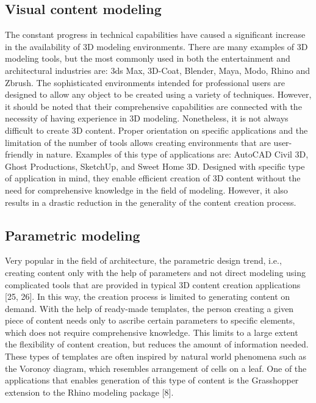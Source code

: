 \documentclass[runningheads]{llncs}
\begin{document}
\subsection{Visual content modeling}
The constant progress in technical capabilities have caused a significant increase in the availability of 3D modeling environments. There are many examples of 3D modeling tools, but the most commonly used in both the entertainment and architectural industries are: 3ds Max, 3D-Coat, Blender, Maya, Modo, Rhino and Zbrush. The sophisticated environments intended for professional users are designed to allow any object to be created using a variety of techniques. However, it should be noted that their comprehensive capabilities are connected with the necessity of having experience in 3D modeling. Nonetheless, it is not always difficult to create 3D content. Proper orientation on specific applications and the limitation of the number of tools allows creating environments that are user-friendly in nature. Examples of this type of applications are: AutoCAD Civil 3D, Ghost Productions, SketchUp, and Sweet Home 3D. Designed with specific type of application in mind, they enable efficient creation of 3D content without the need for comprehensive knowledge in the field of modeling. However, it also results in a drastic reduction in the generality of the content creation process.

\subsection{Parametric modeling}
Very popular in the field of architecture, the parametric design trend, i.e., creating content only with the help of parameters and not direct modeling using complicated tools that are provided in typical 3D content creation applications [25, 26]. In this way, the creation process is limited to generating content on demand. With the help of ready-made templates, the person creating a given piece of content needs only to ascribe certain parameters to specific elements, which does not require comprehensive knowledge. This limits to a large extent the flexibility of content creation, but reduces the amount of information needed. These types of templates are  often inspired by natural world phenomena such as the Voronoy diagram, which resembles arrangement of cells on a leaf. One of the applications that enables generation of this type of content is the Grasshopper extension to the Rhino modeling package [8].
\end{document}
